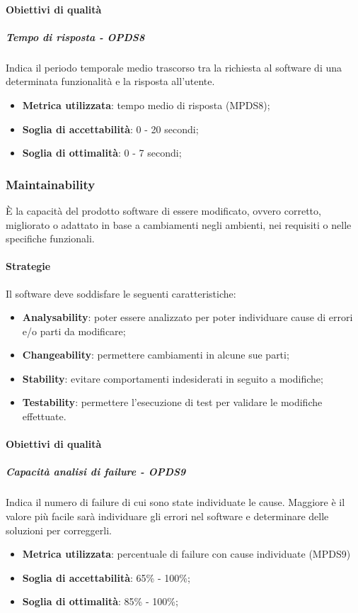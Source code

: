 \documentclass[PdQ.tex]{subfiles}
\begin{document}
			\paragraph{Obiettivi di qualità}

				\subparagraph{Tempo di risposta - OPDS8}
				Indica il periodo temporale medio trascorso tra la richiesta al software di una determinata funzionalità e la risposta all'utente.
				\begin{itemize}
					\item \textbf{Metrica utilizzata}: tempo medio di risposta (MPDS8);
					\item \textbf{Soglia di accettabilità}: 0 - 20 secondi;
					\item \textbf{Soglia di ottimalità}: 0 - 7 secondi;
				\end{itemize}

		\subsubsection{Maintainability}
		È la capacità del prodotto software di essere modificato, ovvero corretto, migliorato o adattato in base a cambiamenti negli ambienti, nei requisiti o
		nelle specifiche funzionali.

			\paragraph{Strategie}
			Il software deve soddisfare le seguenti caratteristiche:
			\begin{itemize}
				\item \textbf{Analysability}: poter essere analizzato per poter individuare cause di errori e/o parti da modificare;
				\item \textbf{Changeability}: permettere cambiamenti in alcune sue parti;
				\item \textbf{Stability}: evitare comportamenti indesiderati in seguito a modifiche;
				\item \textbf{Testability}: permettere l'esecuzione di test per validare le modifiche effettuate.
			\end{itemize}

			\paragraph{Obiettivi di qualità}

				\subparagraph{Capacità analisi di failure - OPDS9}
				Indica il numero di failure di cui sono state individuate le cause.  Maggiore è il valore più facile sarà individuare gli errori nel software
				e determinare delle soluzioni per correggerli.
				\begin{itemize}
					\item \textbf{Metrica utilizzata}: percentuale di failure con cause individuate (MPDS9)
					\item \textbf{Soglia di accettabilità}: 65\% - 100\%;
					\item \textbf{Soglia di ottimalità}: 85\% - 100\%;
				\end{itemize}
\end{document}
